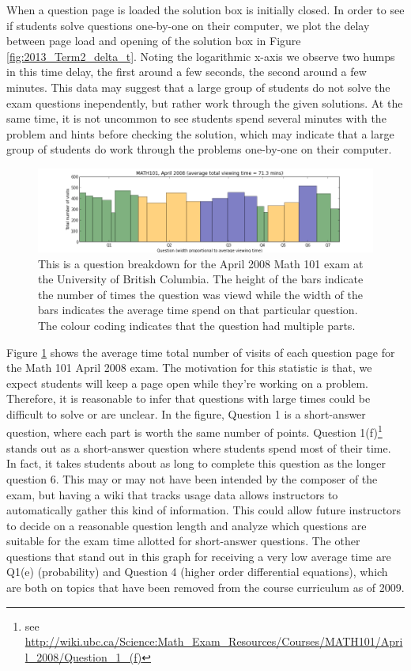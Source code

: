 \documentclass{primus}
\begin{document}
\noindent{}When a question page is loaded the solution box is initially closed. In order to see if students solve questions one-by-one on their computer, we plot the delay between page load and opening of the solution box in Figure \ref{fig:2013_Term2_delta_t}. Noting the logarithmic x-axis we observe two humps in this time delay, the first around a few seconds, the second around a few minutes. This data may suggest that a large group of students do not solve the exam questions inependently, but rather work through the given solutions. At the same time, it is not uncommon to see students spend several minutes with the problem and hints before checking the solution, which may indicate that a large group of students do work through the problems one-by-one on their computer.

\begin{figure}[H]
\centering
\includegraphics[width=\textwidth]{figs/question_dist_MATH101April_2008.png}
\caption{This is a question breakdown for the April 2008 Math 101 exam at the University of British Columbia.  The height of the bars indicate the number of times the question was viewd while the width of the bars indicates the average time spend on that particular question.  The colour coding indicates that the question had multiple parts.}\label{fig:question_dist_MATH101April_2008}
\end{figure}

Figure \ref{fig:question_dist_MATH101April_2008} shows the average time total number of visits of each question page for the Math 101 April 2008 exam.  The motivation for this statistic is that, we expect students will keep a page open while they’re working on a problem.  Therefore, it is reasonable to infer that questions with large times could be difficult to solve or are unclear.  In the figure, Question 1 is a short-answer question, where each part is worth the same number of points. Question 1(f)\footnote{see \url{http://wiki.ubc.ca/Science:Math_Exam_Resources/Courses/MATH101/April_2008/Question_1_(f)}} stands out as a short-answer question where students spend most of their time. In fact, it takes students about as long to complete this question as the longer question 6. This may or may not have been intended by the composer of the exam, but having a wiki that tracks usage data allows instructors to automatically gather this kind of information.  This could allow future instructors to decide on a reasonable question length and analyze which questions are suitable for the exam time allotted for short-answer questions. The other questions that stand out in this graph for receiving a very low average time are Q1(e) (probability) and Question 4 (higher order differential equations), which are both on topics that have been removed from the course curriculum as of 2009.
\end{document}
